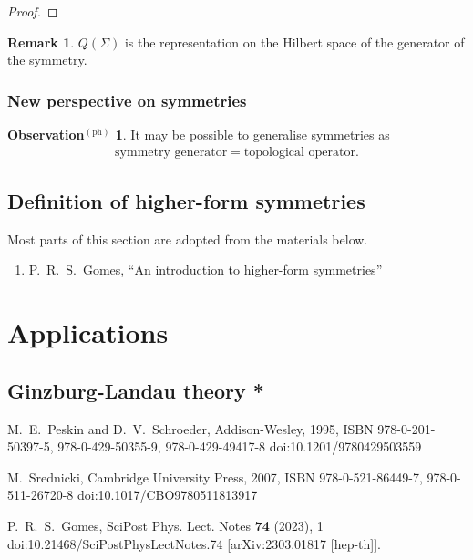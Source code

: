 \documentclass{article}
\theoremstyle{definition}
\newtheorem{remark}{Remark}[section]
\newtheorem{observationph}{Observation$^{(\mathrm{ph})}$}[section]
\numberwithin{equation}{section}
\begin{document}
\begin{proof}
\end{proof}

\begin{remark}
  $Q(\Sigma)$ is the representation on the Hilbert space of the generator of the symmetry.
\end{remark}

\subsubsection{New perspective on symmetries}
\begin{observationph}
  It may be possible to generalise symmetries as
  \begin{align}
    \text{symmetry generator} = \text{topological operator}.
  \end{align}
\end{observationph}
\subsection{Definition of higher-form symmetries}
Most parts of this section are adopted from the materials below.
\begin{enumerate}
\item [\cite{Gomes:2023ahz}] P.~R.~S.~Gomes,
``An introduction to higher-form symmetries''
\end{enumerate}

\subsubsection{}
\section{Applications}
\subsection{Ginzburg-Landau theory *}

\nocite{*}
% 
% 

\begin{thebibliography}{99}
M.~E.~Peskin and D.~V.~Schroeder,
Addison-Wesley, 1995,
ISBN 978-0-201-50397-5, 978-0-429-50355-9, 978-0-429-49417-8
doi:10.1201/9780429503559

M.~Srednicki,
Cambridge University Press, 2007,
ISBN 978-0-521-86449-7, 978-0-511-26720-8
doi:10.1017/CBO9780511813917

P.~R.~S.~Gomes,
SciPost Phys. Lect. Notes \textbf{74} (2023), 1
doi:10.21468/SciPostPhysLectNotes.74
[arXiv:2303.01817 [hep-th]].


\end{thebibliography}
\end{document}
